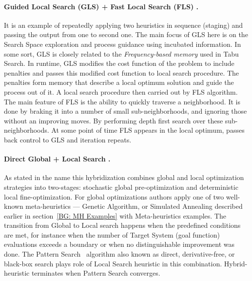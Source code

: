 \paragraph{Guided Local Search (GLS) + Fast Local Search (FLS) \cite{tsang1997fast}.}
It is an example of repeatedly applying two heuristics in sequence (staging) and passing the output from one to second one.
The main focus of GLS here is on the Search Space exploration and process guidance using incubated information. In some sort, GLS is closely related to the \textit{Frequency-based memory} used in Tabu Search. In runtime, GLS modifies the cost function of the problem to include penalties and passes this modified cost function to local search procedure. The penalties form memory that describe a local optimum solution and guide the process out of it. A local search procedure then carried out by FLS algorithm. The main feature of FLS is the ability to quickly traverse a neighborhood. It is done by braking it into a number of small sub-neighborhoods, and ignoring those without an improving moves. By performing depth first search over these sub-neighborhoods. At some point of time FLS appears in the local optimum, passes back control to GLS and iteration repeats. 

\paragraph{Direct Global + Local Search \cite{syrjakow1999efficient}.}
As stated in the name this hybridization combines global and local optimization strategies into two-stages: stochastic global pre-optimization and deterministic local fine-optimization. For global optimizations authors apply one of two well-known meta-heuristics — Genetic Algorithm, or Simulated Annealing described earlier in section~\ref{BG: MH Examples} with Meta-heuristics examples. The transition from Global to Local search happens when the predefined conditions are met, for instance when the number of Target System (goal function) evaluations exceeds a boundary or when no distinguishable improvement was done. The Pattern Search~\cite{hooke1961direct} algorithm also known as direct, derivative-free, or black-box search plays role of Local Search heuristic in this combination. Hybrid-heuristic terminates when Pattern Search converges.


